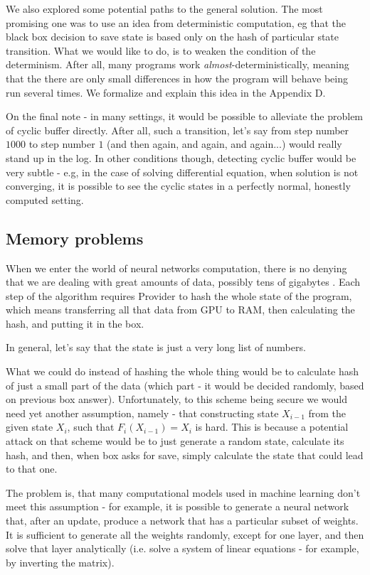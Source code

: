 \documentclass{winnower}
\begin{document}
We also explored some potential paths to the general solution. The most promising one was to use an idea from deterministic computation, eg that the black box decision to save state is based only on the hash of particular state transition. What we would like to do, is to weaken the condition of the determinism. After all, many programs work \textit{almost}-deterministically, meaning that the there are only small differences in how the program will behave being run several times. We formalize and explain this idea in the Appendix D.

On the final note - in many settings, it would be possible to alleviate the problem of cyclic buffer directly. After all, such a transition, let's say from step number $1000$ to step number $1$ (and then again, and again, and again...) would really stand up in the log. In other conditions though, detecting cyclic buffer would be very subtle - e.g, in the case of solving differential equation, when solution is not converging, it is possible to see the cyclic states in a perfectly normal, honestly computed setting.

\subsection{Memory problems}

When we enter the world of neural networks computation, there is no denying that we are dealing with great amounts of data, possibly tens of gigabytes \citep{biggpus}. Each step of the algorithm requires Provider to hash the whole state of the program, which means transferring all that data from GPU to RAM, then calculating the hash, and putting it in the box.

In general, let's say that the state is just a very long list of numbers. 

What we could do instead of hashing the whole thing would be to calculate hash of just a small part of the data (which part - it would be decided randomly, based on previous box answer). Unfortunately, to this scheme being secure we would need yet another assumption, namely - that constructing state $X_{i-1}$ from the given state $X_i$, such that $F_i(X_{i-1}) = X_i$ is hard. This is because a potential attack on that scheme would be to just generate a random state, calculate its hash, and then, when box asks for save, simply calculate the state that could lead to that one.

The problem is, that many computational models used in machine learning don't meet this assumption - for example, it is possible to generate a neural network that, after an update, produce a network that has a particular subset of weights. It is sufficient to generate all the weights randomly, except for one layer, and then solve that layer analytically (i.e. solve a system of linear equations - for example, by inverting the matrix).
\end{document}

